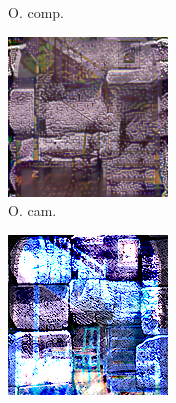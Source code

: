 \begin{figure}[]
\begin{subfigure}{\textwidth}
\begin{subfigure}{0.19\textwidth}
            \caption*{O. comp.}
        \end{subfigure}
        \hfill
        \begin{subfigure}{0.19\textwidth}
            \centering
            \includegraphics[width=\textwidth]{images/04-experiment03/staircase_illum/beams/stats_proj.jpg}
            \caption*{O. cam.}
        \end{subfigure}
        \hfill
        \begin{subfigure}{0.19\textwidth}
            \centering
            \includegraphics[width=\textwidth]{images/04-experiment03/staircase_illum/beams/pixel_im.jpg}

\end{subfigure}
\end{subfigure}
\end{figure}
